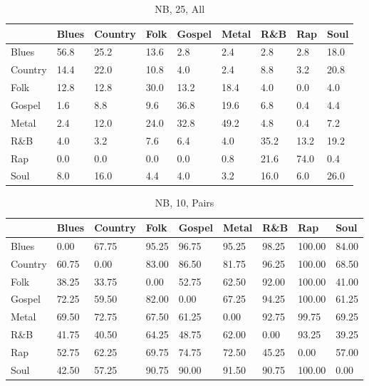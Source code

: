 \documentclass[a4paper,oneside]{article}
\begin{document}
\begin{table}[H]
\caption{NB, 25, All}
\begin{tabu}{l|*{8}{l}}
&Blues & Country & Folk & Gospel & Metal & R\&B & Rap & Soul \\ \hline
Blues & 56.8 & 25.2 & 13.6 & 2.8 & 2.4 & 2.8 & 2.8 & 18.0 \\
Country & 14.4 & 22.0 & 10.8 & 4.0 & 2.4 & 8.8 & 3.2 & 20.8 \\
Folk & 12.8 & 12.8 & 30.0 & 13.2 & 18.4 & 4.0 & 0.0 & 4.0 \\
Gospel & 1.6 & 8.8 & 9.6 & 36.8 & 19.6 & 6.8 & 0.4 & 4.4 \\
Metal & 2.4 & 12.0 & 24.0 & 32.8 & 49.2 & 4.8 & 0.4 & 7.2 \\
R\&B & 4.0 & 3.2 & 7.6 & 6.4 & 4.0 & 35.2 & 13.2 & 19.2 \\
Rap & 0.0 & 0.0 & 0.0 & 0.0 & 0.8 & 21.6 & 74.0 & 0.4 \\
Soul & 8.0 & 16.0 & 4.4 & 4.0 & 3.2 & 16.0 & 6.0 & 26.0 \\
\end{tabu}
\end{table}

\begin{table}[H]
\caption{NB, 10, Pairs}
\begin{tabu}{l|*{8}{l}}
 & Blues & Country & Folk & Gospel & Metal & R\&B & Rap & Soul \\ \hline
Blues & 0.00 & 67.75 & 95.25 & 96.75 & 95.25 & 98.25 & 100.00 & 84.00 \\
Country & 60.75 & 0.00 & 83.00 & 86.50 & 81.75 & 96.25 & 100.00 & 68.50 \\
Folk & 38.25 & 33.75 & 0.00 & 52.75 & 62.50 & 92.00 & 100.00 & 41.00 \\
Gospel & 72.25 & 59.50 & 82.00 & 0.00 & 67.25 & 94.25 & 100.00 & 61.25 \\
Metal & 69.50 & 72.75 & 67.50 & 61.25 & 0.00 & 92.75 & 99.75 & 69.25 \\
R\&B & 41.75 & 40.50 & 64.25 & 48.75 & 62.00 & 0.00 & 93.25 & 39.25 \\
Rap & 52.75 & 62.25 & 69.75 & 74.75 & 72.50 & 45.25 & 0.00 & 57.00 \\
Soul & 42.50 & 57.25 & 90.75 & 90.00 & 91.50 & 90.75 & 100.00 & 0.00 \\
\end{tabu}
\end{table}
\end{document}
